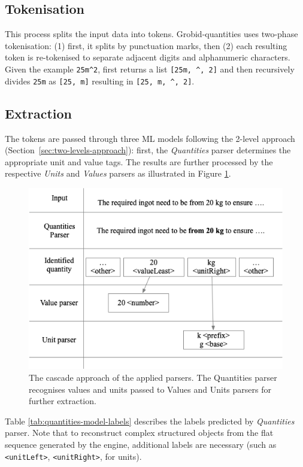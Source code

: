 \subsection{Tokenisation}
This process splits the input data into tokens. Grobid-quantities uses two-phase tokenisation: (1) first, it splits by punctuation marks, then (2) each resulting token is re-tokenised to separate adjacent digits and alphanumeric characters. Given the example \texttt{25m\^{}2}, first returns a list \texttt{[25m, \^{}, 2]} and then recursively divides \texttt{25m} as \texttt{[25, m]}  resulting in \texttt{[25, m, \^{}, 2]}.

\subsection{Extraction}
The tokens are passed through three ML models following the 2-level approach (Section~\ref{sec:two-levels-approach}): first, the \textit{Quantities} parser determines the appropriate unit and value tags. The results are further processed by the respective \textit{Units} and \textit{Values} parsers as illustrated in Figure \ref{fig:schema-cascade}.  

\begin{figure}[htbp]
  \centering
  \includegraphics[width=\linewidth]{figures/quantities/schema-cascade}
  \caption{The cascade approach of the applied parsers. The Quantities parser recognises values and units passed to Values and Units parsers for further extraction.}
  \label{fig:schema-cascade}
\end{figure}

Table \ref{tab:quantities-model-labels} describes the labels predicted by \textit{Quantities} parser. Note that to reconstruct complex structured objects from the flat sequence generated by the engine, additional labels are necessary (such as \texttt{<unitLeft>}, \texttt{<unitRight>}, for units).

